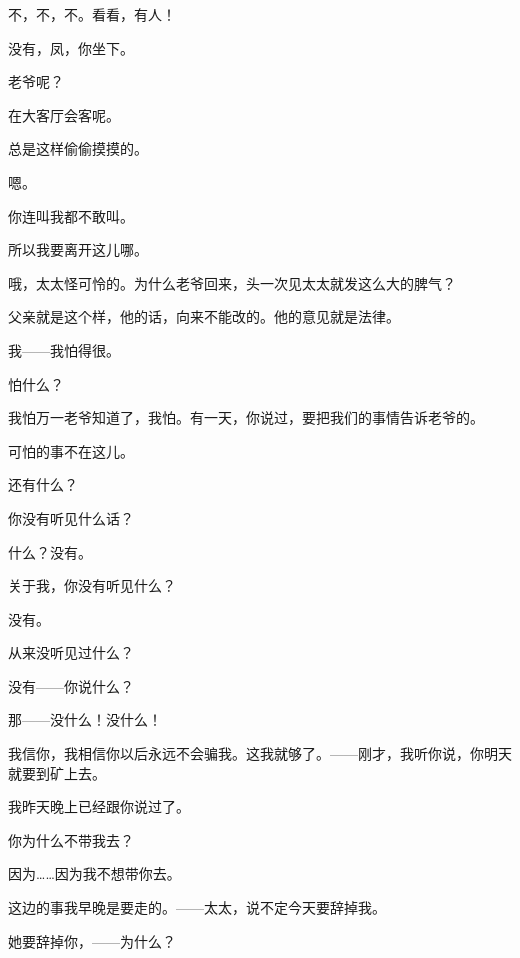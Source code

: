 不，不，不。看看，有人！

没有，凤，你坐下。

老爷呢？

在大客厅会客呢。

总是这样偷偷摸摸的。

嗯。

你连叫我都不敢叫。

所以我要离开这儿哪。

哦，太太怪可怜的。为什么老爷回来，头一次见太太就发这么大的脾气？

父亲就是这个样，他的话，向来不能改的。他的意见就是法律。

我——我怕得很。

怕什么？

我怕万一老爷知道了，我怕。有一天，你说过，要把我们的事情告诉老爷的。

可怕的事不在这儿。

还有什么？

你没有听见什么话？

什么？没有。

关于我，你没有听见什么？

没有。

从来没听见过什么？

没有——你说什么？

那——没什么！没什么！

我信你，我相信你以后永远不会骗我。这我就够了。——刚才，我听你说，你明天就要到矿上去。

我昨天晚上已经跟你说过了。

你为什么不带我去？

因为……因为我不想带你去。

这边的事我早晚是要走的。——太太，说不定今天要辞掉我。

她要辞掉你，——为什么？


